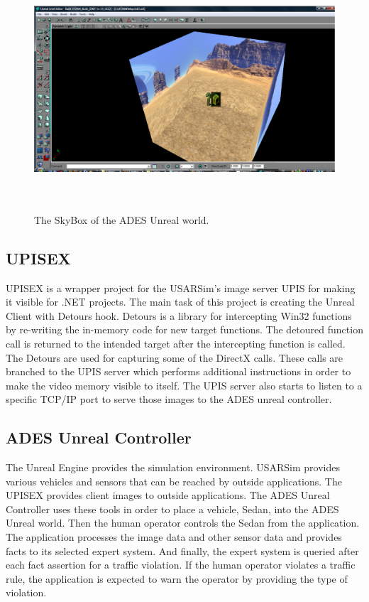 \documentclass[a4paper,oneside,12pt]{report}
\begin{document}
\begin{figure}[ht]
\begin{center}
\includegraphics[width=150mm,height=90mm]{img/SkyBox.eps}
\caption{The SkyBox of the ADES Unreal world.}
\label{fig:SkyBox}
\end{center}
\end{figure}

\subsection{UPISEX}

UPISEX is a wrapper project for the USARSim's image server UPIS for making it visible for .NET projects. The main task of this project is creating the Unreal Client with Detours hook. Detours \cite{hunt_detours_1999} is a library for intercepting Win32 functions by re-writing the in-memory code for new target functions. The detoured function call is returned to the intended target after the intercepting function is called. The Detours are used for capturing some of the DirectX \cite{thorn_directx_2005} calls. These calls are branched to the UPIS server which performs additional instructions in order to make the video memory visible to itself. The UPIS server also starts to listen to a specific TCP/IP port to serve those images to the ADES unreal controller.

\subsection{ADES Unreal Controller}

The Unreal Engine provides the simulation environment. USARSim provides various vehicles and sensors that can be reached by outside applications. The UPISEX provides client images to outside applications. The ADES Unreal Controller uses these tools in order to place a vehicle, Sedan, into the ADES Unreal world. Then the human operator controls the Sedan from the application. The application processes the image data and other sensor data and provides facts to its selected expert system. And finally, the expert system is queried after each fact assertion for a traffic violation. If the human operator violates a traffic rule, the application is expected to  warn the operator by providing the type of violation.
\end{document}
